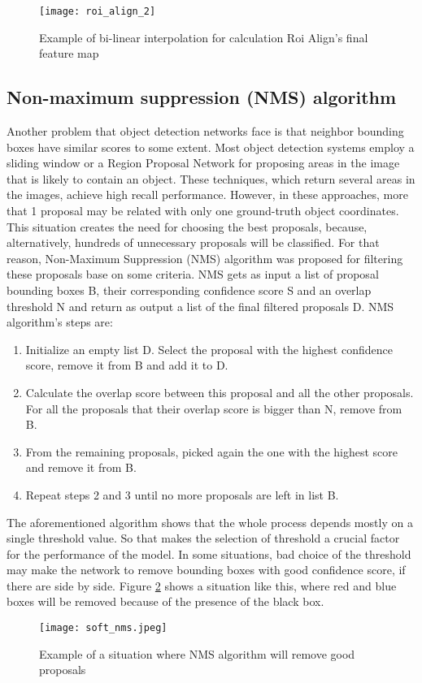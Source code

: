 \begin{figure}[h]
  \centering
  \texttt{[image: roi\_align\_2]}
  \caption{Example of bi-linear interpolation for calculation Roi Align's final feature map}
  \label{fig:roi_align_2}
\end{figure}

\subsection{Non-maximum suppression (NMS) algorithm}

Another problem that object detection networks face is that neighbor bounding boxes have similar scores to some extent. Most object
detection systems employ a sliding window or a Region Proposal Network for proposing areas in the image that is likely to contain an
object. These techniques, which return several areas in the images, achieve high recall performance. However, in these approaches,
more that 1 proposal may be related with only one ground-truth object coordinates. This situation creates
the need for choosing the best proposals, because, alternatively, hundreds of unnecessary proposals will be classified. For that
reason, Non-Maximum Suppression (NMS) algorithm was proposed for filtering these proposals base on some criteria. NMS gets as input
a list of proposal bounding boxes B, their corresponding confidence score S and an overlap threshold N and return as output
a list of the final filtered proposals D. NMS algorithm's steps are:
\begin{enumerate}
  
\item Initialize an empty list D. Select the proposal with the highest confidence score, remove it from B and add it to D.
\item Calculate the overlap score between this proposal and all the other proposals. For all the proposals that their overlap
  score is bigger than N, remove from B.
\item From the remaining proposals, picked again the one with the highest score and remove it from B.
\item Repeat steps 2 and 3 until no more proposals are left in list B.
\end{enumerate}

The aforementioned algorithm shows that the whole process depends mostly on a single threshold value.  So that makes the selection
of threshold a crucial factor for the performance of the model. In some situations, bad choice of the threshold may make the network
to remove bounding boxes with good confidence score, if there are side by side. Figure \ref{fig:nms_eg} shows a situation like this,
where red and blue boxes will be removed because of the presence of the black box.
\begin{figure}[h]
  \centering
  \texttt{[image: soft\_nms.jpeg]}
  \caption{Example of a situation where NMS algorithm will remove good proposals}
  \label{fig:nms_eg}
\end{figure}

